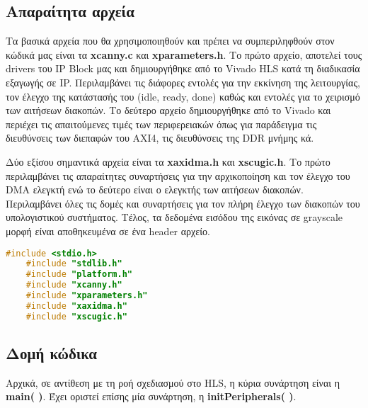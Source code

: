 \subsection{Απαραίτητα αρχεία}

Τα βασικά αρχεία που θα χρησιμοποιηθούν και πρέπει να συμπεριληφθούν στον κώδικά μας είναι τα \textbf{xcanny.c} και \textbf{xparameters.h}. Το πρώτο αρχείο, αποτελεί τους drivers του IP Block μας και δημιουργήθηκε από το Vivado HLS κατά τη διαδικασία εξαγωγής σε IP. Περιλαμβάνει τις διάφορες εντολές για την εκκίνηση της λειτουργίας, τον έλεγχο της κατάστασής του (idle, ready, done) καθώς και εντολές για το χειρισμό των αιτήσεων διακοπών. Το δεύτερο αρχείο δημιουργήθηκε από το Vivado και περιέχει τις απαιτούμενες τιμές των περιφερειακών όπως για παράδειγμα τις διευθύνσεις των διεπαφών του AXI4, τις διευθύνσεις της DDR μνήμης κά.

Δύο εξίσου σημαντικά αρχεία είναι τα \textbf{xaxidma.h} και \textbf{xscugic.h}. Το πρώτο περιλαμβάνει τις απαραίτητες συναρτήσεις για την αρχικοποίηση και τον έλεγχο του DMA ελεγκτή ενώ το δεύτερο είναι ο ελεγκτής των αιτήσεων διακοπών. Περιλαμβάνει όλες τις δομές και συναρτήσεις για τον πλήρη έλεγχο των διακοπών του υπολογιστικού συστήματος. Τέλος, τα δεδομένα εισόδου της εικόνας σε grayscale μορφή είναι αποθηκευμένα σε ένα header αρχείο.

\begin{lstlisting}[language=C++,belowskip=-0.3\baselineskip]
	#include <stdio.h>
	#include "stdlib.h"
	#include "platform.h"
	#include "xcanny.h"
	#include "xparameters.h"
	#include "xaxidma.h"
	#include "xscugic.h"
\end{lstlisting}

\subsection{Δομή κώδικα}

Αρχικά, σε αντίθεση με τη ροή σχεδιασμού στο HLS, η κύρια συνάρτηση είναι η \textbf{main( )}. Έχει οριστεί επίσης μία συνάρτηση, η \textbf{initPeripherals( )}.

